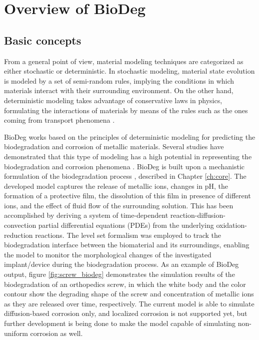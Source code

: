 \section{Overview of BioDeg}

\subsection{Basic concepts}

From a general point of view, material modeling techniques are categorized as either stochastic or deterministic. In stochastic modeling, material state evolution is modeled by a set of semi-random rules, implying the conditions in which materials interact with their surrounding environment. On the other hand, deterministic modeling takes advantage of conservative laws in physics, formulating the interactions of materials by means of the rules such as the ones coming from transport phenomena \cite{Kurtz1972}.

BioDeg works based on the principles of deterministic modeling for predicting the biodegradation and corrosion of metallic materials. Several studies have demonstrated that this type of modeling has a high potential in representing the biodegradation and corrosion phenomena \cite{Dolgikh2019, Bajger2016, SanzHerrera2018}. BioDeg is built upon a mechanistic formulation of the biodegradation process \cite{Barzegari2021}, described in Chapter \ref{ch:core}. The developed model captures the release of metallic ions, changes in pH, the formation of a protective film, the dissolution of this film in presence of different ions, and the effect of fluid flow of the surrounding solution. This has been accomplished by deriving a system of time-dependent reaction-diffusion-convection partial differential equations (\gls{PDE}s) from the underlying oxidation-reduction reactions. The level set formalism \cite{RonaldFedkiw2002} was employed to track the biodegradation interface between the biomaterial and its surroundings, enabling the model to monitor the morphological changes of the investigated implant/device during the biodegradation process. As an example of BioDeg output, figure \ref{fig:screw_biodeg} demonstrates the simulation results of the biodegradation of an orthopedics screw, in which the white body and the color contour show the degrading shape of the screw and concentration of metallic ions as they are released over time, respectively. The current model is able to simulate diffusion-based corrosion only, and localized corrosion is not supported yet, but further development is being done to make the model capable of simulating non-uniform corrosion as well.

